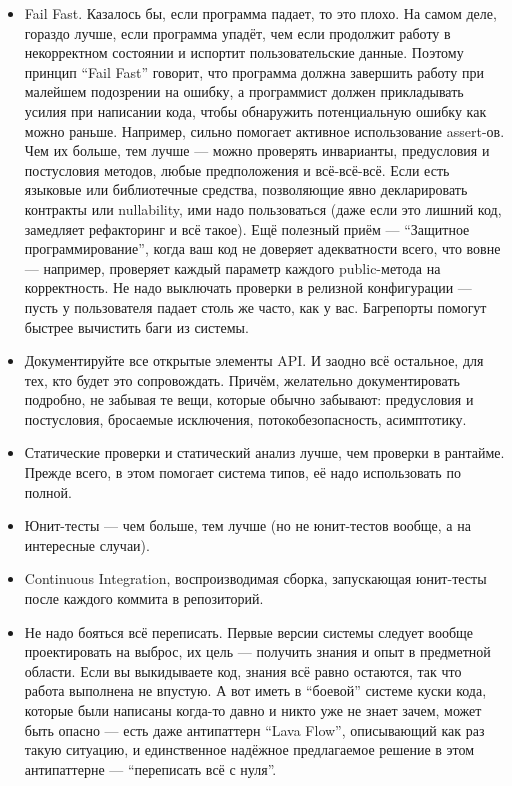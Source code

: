 \documentclass{../../text-style}
\begin{document}
\begin{itemize}
	\item Fail Fast. Казалось бы, если программа падает, то это плохо. На самом деле, гораздо лучше, если программа упадёт, чем если продолжит работу в некорректном состоянии и испортит пользовательские данные. Поэтому принцип ``Fail Fast'' говорит, что программа должна завершить работу при малейшем подозрении на ошибку, а программист должен прикладывать усилия при написании кода, чтобы обнаружить потенциальную ошибку как можно раньше. Например, сильно помогает активное использование assert-ов. Чем их больше, тем лучше --- можно проверять инварианты, предусловия и постусловия методов, любые предположения и всё-всё-всё. Если есть языковые или библиотечные средства, позволяющие явно декларировать контракты или nullability, ими надо пользоваться (даже если это лишний код, замедляет рефакторинг и всё такое). Ещё полезный приём --- ``Защитное программирование'', когда ваш код не доверяет адекватности всего, что вовне --- например, проверяет каждый параметр каждого public-метода на корректность. Не надо выключать проверки в релизной конфигурации --- пусть у пользователя падает столь же часто, как у вас. Багрепорты помогут быстрее вычистить баги из системы.
	\item Документируйте все открытые элементы API. И заодно всё остальное, для тех, кто будет это сопровождать. Причём, желательно документировать подробно, не забывая те вещи, которые обычно забывают: предусловия и постусловия, бросаемые исключения, потокобезопасность, асимптотику.
	\item Статические проверки и статический анализ лучше, чем проверки в рантайме. Прежде всего, в этом помогает система типов, её надо использовать по полной.
	\item Юнит-тесты --- чем больше, тем лучше (но не юнит-тестов вообще, а на интересные случаи).
	\item Continuous Integration, воспроизводимая сборка, запускающая юнит-тесты после каждого коммита в репозиторий.
	\item Не надо бояться всё переписать. Первые версии системы следует вообще проектировать на выброс, их цель --- получить знания и опыт в предметной области. Если вы выкидываете код, знания всё равно остаются, так что работа выполнена не впустую. А вот иметь в ``боевой'' системе куски кода, которые были написаны когда-то давно и никто уже не знает зачем, может быть опасно --- есть даже антипаттерн ``Lava Flow'', описывающий как раз такую ситуацию, и единственное надёжное предлагаемое решение в этом антипаттерне --- ``переписать всё с нуля''.
\end{itemize}
\end{document}

